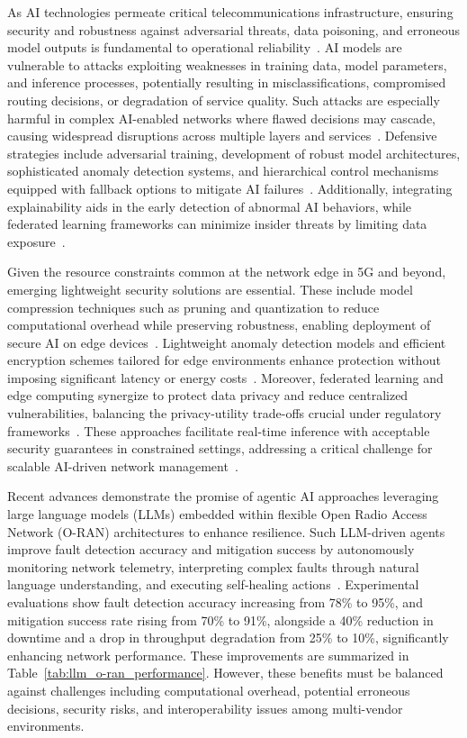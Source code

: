 \documentclass[sigconf]{acmart}
\begin{document}
As AI technologies permeate critical telecommunications infrastructure, ensuring security and robustness against adversarial threats, data poisoning, and erroneous model outputs is fundamental to operational reliability~\cite{ref48,ref50,ref55}. AI models are vulnerable to attacks exploiting weaknesses in training data, model parameters, and inference processes, potentially resulting in misclassifications, compromised routing decisions, or degradation of service quality. Such attacks are especially harmful in complex AI-enabled networks where flawed decisions may cascade, causing widespread disruptions across multiple layers and services~\cite{ref50}. Defensive strategies include adversarial training, development of robust model architectures, sophisticated anomaly detection systems, and hierarchical control mechanisms equipped with fallback options to mitigate AI failures~\cite{ref55}. Additionally, integrating explainability aids in the early detection of abnormal AI behaviors, while federated learning frameworks can minimize insider threats by limiting data exposure~\cite{ref48}.

Given the resource constraints common at the network edge in 5G and beyond, emerging lightweight security solutions are essential. These include model compression techniques such as pruning and quantization to reduce computational overhead while preserving robustness, enabling deployment of secure AI on edge devices~\cite{ref48,ref50}. Lightweight anomaly detection models and efficient encryption schemes tailored for edge environments enhance protection without imposing significant latency or energy costs~\cite{ref50}. Moreover, federated learning and edge computing synergize to protect data privacy and reduce centralized vulnerabilities, balancing the privacy-utility trade-offs crucial under regulatory frameworks~\cite{ref48}. These approaches facilitate real-time inference with acceptable security guarantees in constrained settings, addressing a critical challenge for scalable AI-driven network management~\cite{ref50}.

Recent advances demonstrate the promise of agentic AI approaches leveraging large language models (LLMs) embedded within flexible Open Radio Access Network (O-RAN) architectures to enhance resilience. Such LLM-driven agents improve fault detection accuracy and mitigation success by autonomously monitoring network telemetry, interpreting complex faults through natural language understanding, and executing self-healing actions~\cite{ref55}. Experimental evaluations show fault detection accuracy increasing from 78\% to 95\%, and mitigation success rate rising from 70\% to 91\%, alongside a 40\% reduction in downtime and a drop in throughput degradation from 25\% to 10\%, significantly enhancing network performance. These improvements are summarized in Table~\ref{tab:llm_o-ran_performance}. However, these benefits must be balanced against challenges including computational overhead, potential erroneous decisions, security risks, and interoperability issues among multi-vendor environments. 
\end{document}
